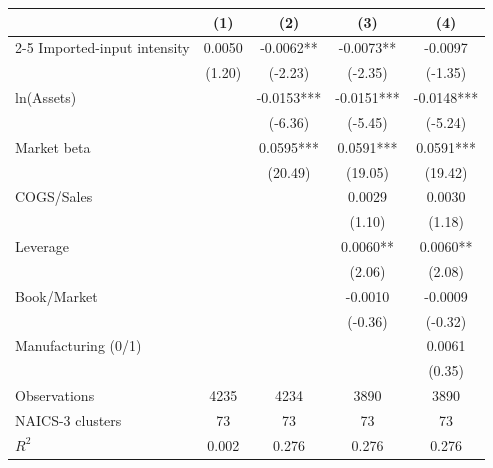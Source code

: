 \begin{tabular}{lcccc}
\toprule
& \multicolumn{1}{c}{(1)} & \multicolumn{1}{c}{(2)} & \multicolumn{1}{c}{(3)} & \multicolumn{1}{c}{(4)} \\
\cmidrule(lr){2-5}
Imported-input intensity & 0.0050 & -0.0062** & -0.0073** & -0.0097 \\
 & (1.20) & (-2.23) & (-2.35) & (-1.35) \\[3pt]
ln(Assets) &  & -0.0153*** & -0.0151*** & -0.0148*** \\
 &  & (-6.36) & (-5.45) & (-5.24) \\[3pt]
Market beta &  & 0.0595*** & 0.0591*** & 0.0591*** \\
 &  & (20.49) & (19.05) & (19.42) \\[3pt]
COGS/Sales &  &  & 0.0029 & 0.0030 \\
 &  &  & (1.10) & (1.18) \\[3pt]
Leverage &  &  & 0.0060** & 0.0060** \\
 &  &  & (2.06) & (2.08) \\[3pt]
Book/Market &  &  & -0.0010 & -0.0009 \\
 &  &  & (-0.36) & (-0.32) \\[3pt]
Manufacturing (0/1) &  &  &  & 0.0061 \\
 &  &  &  & (0.35) \\[3pt]
\midrule
Observations & 4235 & 4234 & 3890 & 3890 \\
NAICS-3 clusters & 73 & 73 & 73 & 73 \\
$R^2$ & 0.002 & 0.276 & 0.276 & 0.276 \\
\bottomrule
\end{tabular}